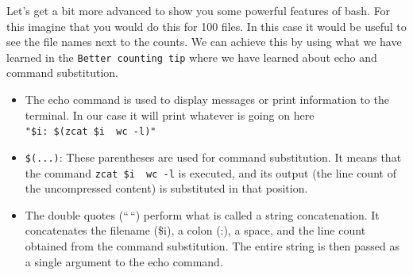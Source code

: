 \documentclass[
  letterpaper,
  DIV=11,
  numbers=noendperiod]{scrreprt}
\newenvironment{Shaded}{}{}
\newcommand{\AttributeTok}[1]{\textcolor[rgb]{0.84,0.23,0.29}{#1}}
\newcommand{\BuiltInTok}[1]{\textcolor[rgb]{0.84,0.23,0.29}{#1}}
\newcommand{\ControlFlowTok}[1]{\textcolor[rgb]{0.84,0.23,0.29}{#1}}
\newcommand{\FunctionTok}[1]{\textcolor[rgb]{0.44,0.26,0.76}{#1}}
\newcommand{\KeywordTok}[1]{\textcolor[rgb]{0.84,0.23,0.29}{#1}}
\newcommand{\NormalTok}[1]{\textcolor[rgb]{0.14,0.16,0.18}{#1}}
\newcommand{\PreprocessorTok}[1]{\textcolor[rgb]{0.84,0.23,0.29}{#1}}
\newcommand{\StringTok}[1]{\textcolor[rgb]{0.01,0.18,0.38}{#1}}
\newcommand{\VariableTok}[1]{\textcolor[rgb]{0.89,0.38,0.04}{#1}}
\providecommand{\tightlist}{%
  \setlength{\itemsep}{0pt}\setlength{\parskip}{0pt}}\usepackage{longtable,booktabs,array}
\begin{document}
\begin{tcolorbox}[enhanced jigsaw, title=\textcolor{quarto-callout-tip-color}{\faLightbulb}\hspace{0.5em}{Avanced Tip: Better counting in for loops}, colframe=quarto-callout-tip-color-frame, opacitybacktitle=0.6, rightrule=.15mm, arc=.35mm, left=2mm, colbacktitle=quarto-callout-tip-color!10!white, bottomrule=.15mm, leftrule=.75mm, toprule=.15mm, opacityback=0, bottomtitle=1mm, colback=white, toptitle=1mm, breakable, titlerule=0mm, coltitle=black]

Let's get a bit more advanced to show you some powerful features of
bash. For this imagine that you would do this for 100 files. In this
case it would be useful to see the file names next to the counts. We can
achieve this by using what we have learned in the
\texttt{Better\ counting\ tip} where we have learned about echo and
command substitution.

\begin{Shaded}
\end{Shaded}

\begin{itemize}
\tightlist
\item
  The echo command is used to display messages or print information to
  the terminal. In our case it will print whatever is going on here
  \texttt{"\$i:\ \$(zcat\ \$i\ \textbar{}\ wc\ -l)"}
\item
  \texttt{\$(...)}: These parentheses are used for command substitution.
  It means that the command \texttt{zcat\ \$i\ \textbar{}\ wc\ -l} is
  executed, and its output (the line count of the uncompressed content)
  is substituted in that position.
\item
  The double quotes (``\,``) perform what is called a string
  concatenation. It concatenates the filename (\$i), a colon (:), a
  space, and the line count obtained from the command substitution. The
  entire string is then passed as a single argument to the echo command.
\end{itemize}


\end{tcolorbox}
\end{document}
